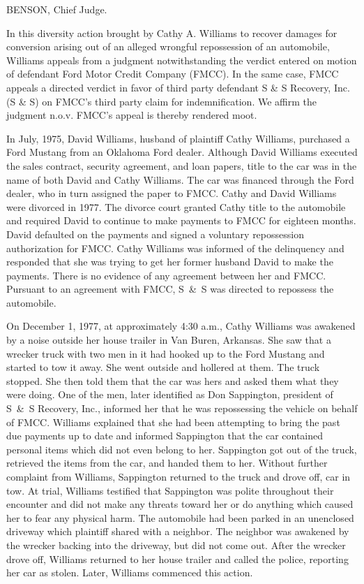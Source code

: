 
BENSON, Chief Judge.

In this diversity action brought by Cathy A. Williams to recover damages for
conversion arising out of an alleged wrongful repossession of an automobile,
Williams appeals from a judgment notwithstanding the verdict entered on motion
of defendant Ford Motor Credit Company (FMCC). In the same case, FMCC appeals a
directed verdict in favor of third party defendant S \& S Recovery, Inc. (S \&
S) on FMCC's third party claim for indemnification. We affirm the judgment
n.o.v. FMCC's appeal is thereby rendered moot.

In July, 1975, David Williams, husband of plaintiff Cathy Williams, purchased a
Ford Mustang from an Oklahoma Ford dealer. Although David Williams executed the
sales contract, security agreement, and loan papers, title to the car was in
the name of both David and Cathy Williams. The car was financed through the
Ford dealer, who in turn assigned the paper to FMCC. Cathy and David Williams
were divorced in 1977. The divorce court granted Cathy title to the automobile
and required David to continue to make payments to FMCC for eighteen months.
David defaulted on the payments and signed a voluntary repossession
authorization for FMCC. Cathy Williams was informed of the delinquency and
responded that she was trying to get her former husband David to make the
payments. There is no evidence of any agreement between her and FMCC. Pursuant
to an agreement with FMCC, S~\&~S was directed to repossess the automobile.

On December 1, 1977, at approximately 4:30 a.m., Cathy Williams was awakened by
a noise outside her house trailer in Van Buren,
Arkansas. She saw that a wrecker truck with two
men in it had hooked up to the Ford Mustang and started to tow it away. She went
outside and hollered at them. The truck stopped. She then told them that the car
was hers and asked them what they were doing. One of the men, later identified
as Don Sappington, president of S~\&~S Recovery, Inc., informed her that he was
repossessing the vehicle on behalf of FMCC. Williams explained that she had been
attempting to bring the past due payments up to date and informed Sappington
that the car contained personal items which did not even belong to her.
Sappington got out of the truck, retrieved the items from the car, and handed
them to her. Without further complaint from Williams, Sappington returned to the
truck and drove off, car in tow. At trial, Williams testified that Sappington
was polite throughout their encounter and did not make any threats toward her or
do anything which caused her to fear any physical harm. The automobile had been
parked in an unenclosed driveway which plaintiff shared with a neighbor. The
neighbor was awakened by the wrecker backing into the driveway, but did not come
out. After the wrecker drove off, Williams returned to her house trailer and
called the police, reporting her car as stolen. Later, Williams commenced this
action.

